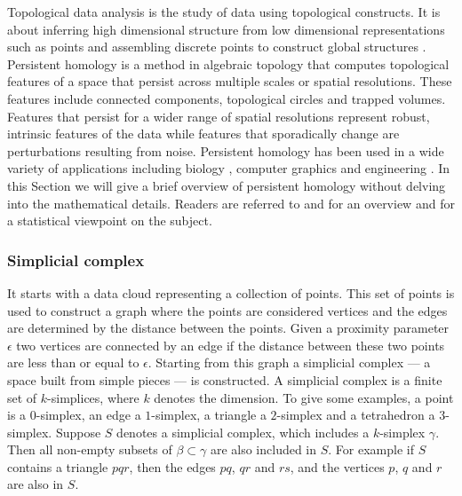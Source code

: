 \documentclass[11pt,a4paper,]{article}
\theoremstyle{definition}
\theoremstyle{definition}
\theoremstyle{definition}
\theoremstyle{remark}
\begin{document}
Topological data analysis is the study of data using topological constructs. It is about inferring high dimensional structure from low dimensional representations such as points and assembling discrete points to construct global structures \autocite{ghrist2008barcodes}. Persistent homology is a method in algebraic topology that computes topological features of a space that persist across multiple scales or spatial resolutions. These features include connected components, topological circles and trapped volumes. Features that persist for a wider range of spatial resolutions represent robust, intrinsic features of the data while features that sporadically change are perturbations resulting from noise. Persistent homology has been used in a wide variety of applications including biology \autocite{topaz2015topological}, computer graphics \autocite{carlsson2008local} and engineering \autocite{perea2015sliding}. In this Section we will give a brief overview of persistent homology without delving into the mathematical details. Readers are referred to \textcite{ghrist2008barcodes} and \textcite{Carlsson2009} for an overview and \textcite{wasserman2018topological} for a statistical viewpoint on the subject.

\hypertarget{subsubsec:simplicialcomplex}{%
\subsubsection{Simplicial complex}\label{subsubsec:simplicialcomplex}}

It starts with a data cloud representing a collection of points. This set of points is used to construct a graph where the points are considered vertices and the edges are determined by the distance between the points. Given a proximity parameter \(\epsilon\) two vertices are connected by an edge if the distance between these two points are less than or equal to \(\epsilon\). Starting from this graph a simplicial complex --- a space built from simple pieces --- is constructed. A simplicial complex is a finite set of \(k\)-simplices, where \(k\) denotes the dimension. To give some examples, a point is a \(0\)-simplex, an edge a \(1\)-simplex, a triangle a \(2\)-simplex and a tetrahedron a \(3\)-simplex. Suppose \(S\) denotes a simplicial complex, which includes a \(k\)-simplex \(\gamma\). Then all non-empty subsets of \(\beta \subset \gamma\) are also included in \(S\). For example if \(S\) contains a triangle \(pqr\), then the edges \(pq\), \(qr\) and \(rs\), and the vertices \(p\), \(q\) and \(r\) are also in \(S\).
\end{document}

